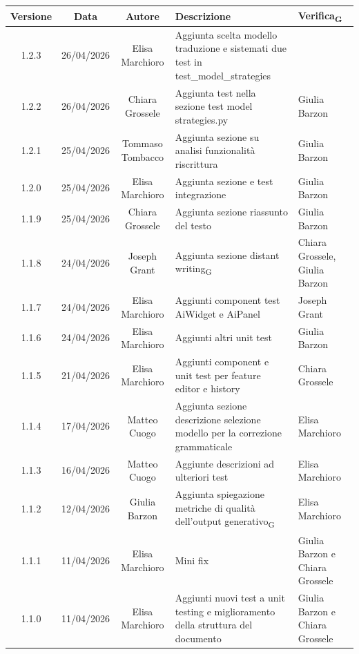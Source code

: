 \documentclass[11pt,a4paper]{article}
\newcommand{\gls}[1]{#1\textsubscript{G}}
\begin{document}
\begin{table}[H]
    \centering
    \begin{tabular}{|c|c|c|>{\raggedright\arraybackslash}p{}|p{}|}
        \hline
        \textbf{Versione} & \textbf{Data} & \textbf{Autore} & \textbf{Descrizione} & \textbf{\gls{Verifica}} \\
        \hline
        1.2.3 & 26/04/2026 & Elisa Marchioro & Aggiunta scelta modello traduzione e sistemati due test in test\_model\_strategies & \\
        \hline
        1.2.2 & 26/04/2026 & Chiara Grossele & Aggiunta test nella sezione test model strategies.py & Giulia Barzon \\
        \hline
        1.2.1 & 25/04/2026 & Tommaso Tombacco & Aggiunta sezione su analisi funzionalità riscrittura & Giulia Barzon\\
        \hline
        1.2.0 & 25/04/2026 & Elisa Marchioro & Aggiunta sezione e test integrazione & Giulia Barzon\\
        \hline
        1.1.9 & 25/04/2026 & Chiara Grossele & Aggiunta sezione riassunto del testo & Giulia Barzon\\
        \hline
        1.1.8 & 24/04/2026 & Joseph Grant & Aggiunta sezione \gls{distant writing} & Chiara Grossele, Giulia Barzon\\
        \hline
        1.1.7 & 24/04/2026 & Elisa Marchioro & Aggiunti component test AiWidget e AiPanel & Joseph Grant \\
        \hline
        1.1.6 & 24/04/2026 & Elisa Marchioro & Aggiunti altri unit test & Giulia Barzon\\
        \hline
        1.1.5 & 21/04/2026 & Elisa Marchioro & Aggiunti component e unit test per feature editor e history & Chiara Grossele\\
        \hline
        1.1.4 & 17/04/2026 & Matteo Cuogo & Aggiunta sezione descrizione selezione modello per la correzione grammaticale & Elisa Marchioro\\
        \hline
        1.1.3 & 16/04/2026 & Matteo Cuogo & Aggiunte descrizioni ad ulteriori test & Elisa Marchioro\\
        \hline
        1.1.2 & 12/04/2026 & Giulia Barzon & Aggiunta spiegazione metriche di \gls{qualità dell'output generativo} & Elisa Marchioro\\
        \hline
        1.1.1 & 11/04/2026 & Elisa Marchioro & Mini fix & Giulia Barzon e Chiara Grossele\\
        \hline
        1.1.0 & 11/04/2026 & Elisa Marchioro & Aggiunti nuovi test a unit testing e miglioramento della struttura del documento & Giulia Barzon e Chiara Grossele\\

\end{tabular}
\end{table}
\end{document}
